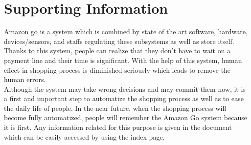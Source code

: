 \section{Supporting Information}
Amazon go is a system which is combined by state of the art software, hardware, devices/sensors, and staffs regulating these subsystems as well as store itself. Thanks to this system, people can realize that they don't have to wait on a payment line and their time is significant. With the help of this system, human effect in shopping process is diminished seriously which leads to remove the human errors.  \\

Although the system may take wrong decisions and may commit them now, it is a first and important step to automatize the shopping process as well as to ease the daily life of people. In the near future, when the shopping process will become fully automatized, people will remember the Amazon Go system because it is first. Any information related for this purpose is given in the document which can be easily accessed by using the index page.

